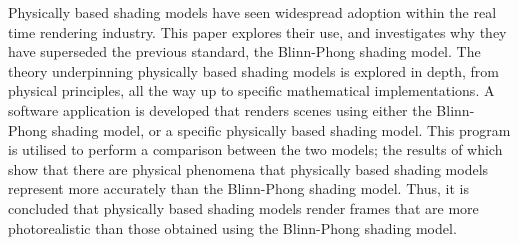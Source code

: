 Physically based shading models have seen widespread adoption within the real time rendering industry. This paper explores their use, and investigates why they have superseded the previous standard, the Blinn-Phong shading model. The theory underpinning physically based shading models is explored in depth, from physical principles, all the way up to specific mathematical implementations. A software application is developed that renders scenes using either the Blinn-Phong shading model, or a specific physically based shading model. This program is utilised to perform a comparison between the two models; the results of which show that there are physical phenomena that physically based shading models represent more accurately than the Blinn-Phong shading model. Thus, it is concluded that physically based shading models render frames that are more photorealistic than those obtained using the Blinn-Phong shading model.